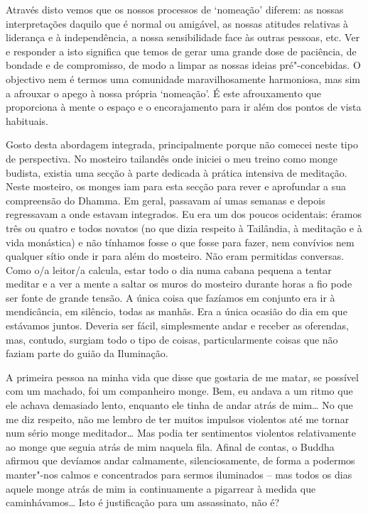 Através disto
vemos que os nossos processos de `nomeação' diferem: as nossas interpretações
daquilo que é normal ou amigável, as nossas atitudes relativas à liderança e à
independência, a nossa sensibilidade face às outras pessoas, etc. Ver e
responder a isto significa que temos de gerar uma grande dose de paciência, de
bondade e de compromisso, de modo a limpar as nossas ideias pré"-concebidas. O
objectivo nem é termos uma comunidade maravilhosamente harmoniosa, mas sim a
afrouxar o apego à nossa própria `nomeação'. É este afrouxamento que proporciona
à mente o espaço e o encorajamento para ir além dos pontos de vista habituais.

Gosto desta abordagem integrada, principalmente porque não comecei neste tipo de
perspectiva. No mosteiro tailandês onde iniciei o meu treino como monge budista,
existia uma secção à parte dedicada à prática intensiva de meditação. Neste
mosteiro, os monges iam para esta secção para rever e aprofundar a sua
compreensão do Dhamma. Em geral, passavam aí umas semanas e depois regressavam a
onde estavam integrados. Eu era um dos poucos ocidentais: éramos três ou quatro
e todos novatos (no que dizia respeito à Tailândia, à meditação e à vida
monástica) e não tínhamos fosse o que fosse para fazer, nem convívios nem
qualquer sítio onde ir para além do mosteiro. Não eram permitidas conversas.
Como o/a leitor/a calcula, estar todo o dia numa cabana pequena a tentar meditar
e a ver a mente a saltar os muros do mosteiro durante horas a fio pode ser fonte
de grande tensão. A única coisa que fazíamos em conjunto era ir à mendicância,
em silêncio, todas as manhãs. Era a única ocasião do dia em que estávamos
juntos. Deveria ser fácil, simplesmente andar e receber as oferendas, mas,
contudo, surgiam todo o tipo de coisas, particularmente coisas que não faziam
parte do guião da Iluminação.

A primeira pessoa na minha vida que disse que gostaria de me matar, se possível
com um machado, foi um companheiro monge. Bem, eu andava a um ritmo que ele
achava demasiado lento, enquanto ele tinha de andar atrás de mim\ldots{} No que
me diz respeito, não me lembro de ter muitos impulsos violentos até me tornar
num sério monge meditador\ldots{} Mas podia ter sentimentos violentos
relativamente ao monge que seguia atrás de mim naquela fila. Afinal de contas, o
Buddha afirmou que devíamos andar calmamente, silenciosamente, de forma a
podermos manter"-nos calmos e concentrados para sermos iluminados -- mas todos
os dias aquele monge atrás de mim ia continuamente a pigarrear à medida que
caminhávamos\ldots{} Isto é justificação para um assassinato, não é?

